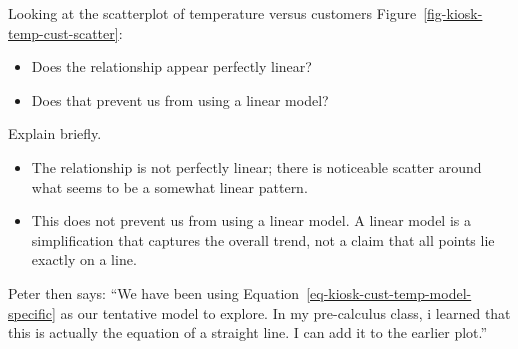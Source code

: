 \documentclass[
  12pt,
  letterpaper,
  DIV=11,
  numbers=noendperiod]{scrreprt}
\providecommand{\tightlist}{%
  \setlength{\itemsep}{0pt}\setlength{\parskip}{0pt}}
\begin{document}
\begin{tcolorbox}[enhanced jigsaw, colback=white, leftrule=.75mm, toprule=.15mm, bottomtitle=1mm, breakable, coltitle=black, toptitle=1mm, title=\textcolor{quarto-callout-note-color}{\faInfo}\hspace{0.5em}{Quick Check}, opacitybacktitle=0.6, colbacktitle=quarto-callout-note-color!10!white, arc=.35mm, left=2mm, colframe=quarto-callout-note-color-frame, titlerule=0mm, rightrule=.15mm, bottomrule=.15mm, opacityback=0]

Looking at the scatterplot of temperature versus customers
Figure~\ref{fig-kiosk-temp-cust-scatter}:

\begin{itemize}
\tightlist
\item
  Does the relationship appear perfectly linear?
\item
  Does that prevent us from using a linear model?
\end{itemize}

Explain briefly.

\end{tcolorbox}

\begin{tcolorbox}[enhanced jigsaw, colback=white, leftrule=.75mm, toprule=.15mm, bottomtitle=1mm, breakable, coltitle=black, toptitle=1mm, title=\textcolor{quarto-callout-note-color}{\faInfo}\hspace{0.5em}{Answer}, opacitybacktitle=0.6, colbacktitle=quarto-callout-note-color!10!white, arc=.35mm, left=2mm, colframe=quarto-callout-note-color-frame, titlerule=0mm, rightrule=.15mm, bottomrule=.15mm, opacityback=0]

\begin{itemize}
\item
  The relationship is not perfectly linear; there is noticeable scatter
  around what seems to be a somewhat linear pattern.
\item
  This does not prevent us from using a linear model. A linear model is
  a simplification that captures the overall trend, not a claim that all
  points lie exactly on a line.
\end{itemize}

\end{tcolorbox}

Peter then says: ``We have been using
Equation~\ref{eq-kiosk-cust-temp-model-specific} as our tentative model
to explore. In my pre-calculus class, i learned that this is actually
the equation of a straight line. I can add it to the earlier plot.''
\end{document}
